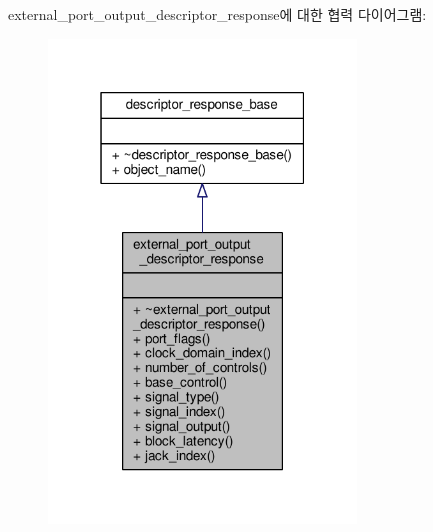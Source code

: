 external\+\_\+port\+\_\+output\+\_\+descriptor\+\_\+response에 대한 협력 다이어그램\+:
\nopagebreak
\begin{figure}[H]
\begin{center}
\leavevmode
\includegraphics[width=232pt]{classavdecc__lib_1_1external__port__output__descriptor__response__coll__graph}
\end{center}
\end{figure}
